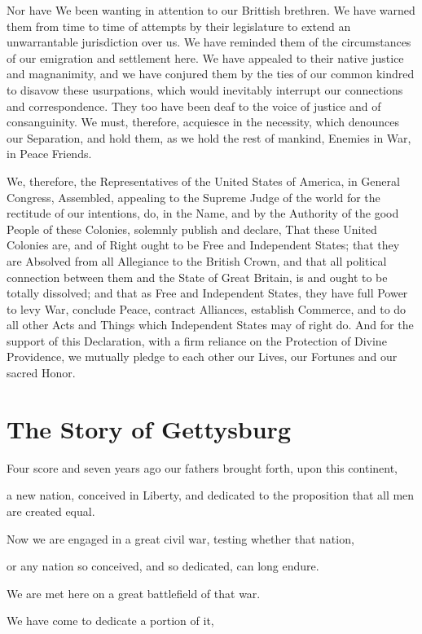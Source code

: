 \documentclass{article}
\begin{document}
Nor have We been wanting in attention to our Brittish brethren.
We have warned them from time to time of attempts by their
legislature to extend an unwarrantable jurisdiction over us.
We have reminded them of the circumstances of our emigration and
settlement here.  We have appealed to their native justice
and magnanimity, and we have conjured them by the ties of our
common kindred to disavow these usurpations, which would inevitably
interrupt our connections and correspondence.  They too have been
deaf to the voice of justice and of consanguinity.  We must, therefore,
acquiesce in the necessity, which denounces our Separation, and hold them,
as we hold the rest of mankind, Enemies in War, in Peace Friends.

We, therefore, the Representatives of the United States of America,
in General Congress, Assembled, appealing to the Supreme Judge of
the world for the rectitude of our intentions, do, in the Name,
and by the Authority of the good People of these Colonies,
solemnly publish and declare, That these United Colonies are,
and of Right ought to be Free and Independent States;
that they are Absolved from all Allegiance to the British Crown,
and that all political connection between them and the State
of Great Britain, is and ought to be totally dissolved;
and that as Free and Independent States, they have full Power to
levy War, conclude Peace, contract Alliances, establish Commerce,
and to do all other Acts and Things which Independent States may
of right do.  And for the support of this Declaration, with a firm
reliance on the Protection of Divine Providence, we mutually pledge
to each other our Lives, our Fortunes and our sacred Honor.

\section{The Story of Gettysburg}

Four score and seven years ago our fathers brought forth, upon this continent, 

a new nation, conceived in Liberty, and dedicated to the proposition that all men are created equal.

Now we are engaged in a great civil war, testing whether that nation, 

or any nation so conceived, and so dedicated, can long endure. 

We are met here on a great battlefield of that war. 

We have come to dedicate a portion of it, 
\end{document}
